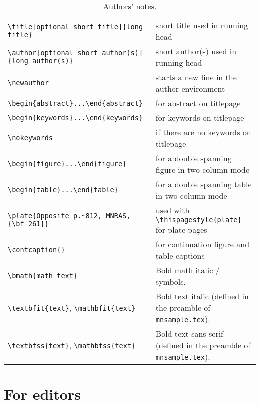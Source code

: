 \documentclass[useAMS,usenatbib]{mn2e}
\begin{document}
\begin{table*}
\begin{minipage}{155mm}
\caption{Authors' notes.}
\label{authors}
\begin{tabular}{@{}ll}
\verb"\title[optional short title]{long title}"
                    & short title used in running head\\
\verb"\author[optional short author(s)]{long author(s)}"
                    & short author(s) used in running head\\
\verb"\newauthor"   & starts a new line in the author environment\\
\verb"\begin{abstract}...\end{abstract}"& for abstract on titlepage\\
\verb"\begin{keywords}...\end{keywords}"& for keywords on titlepage\\
\verb"\nokeywords"  & if there are no keywords on titlepage\\
\verb"\begin{figure*}...\end{figure*}" & for a double spanning figure in two-column mode\\
\verb"\begin{table*}...\end{table*}" & for a double spanning table in
                                       two-column mode\\
\verb"\plate{Opposite p.~812, MNRAS, {\bf 261}}"
                  & used with \verb"\thispagestyle{plate}" for plate pages\\
\verb"\contcaption{}" & for continuation figure and table captions\\
\verb"\bmath{math text}" & Bold math italic / symbols.\\
\verb"\textbfit{text}", \verb"\mathbfit{text}" & Bold text italic
   (defined in the preamble of \verb"mnsample.tex").\\
\verb"\textbfss{text}", \verb"\mathbfss{text}" & Bold text sans serif
   (defined in the preamble of \verb"mnsample.tex").\\
\end{tabular}
\end{minipage}
\end{table*}


\section{For editors}
\end{document}
